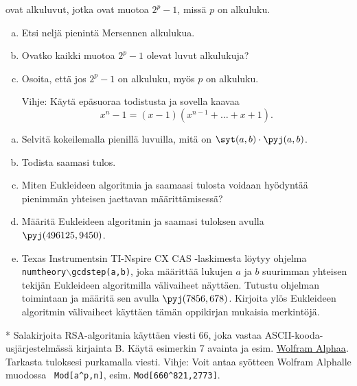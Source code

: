 \begin{kotitehtavasivu}
\begin{tehtava}
     ovat alkuluvut, jotka ovat
    muotoa $2^p - 1$, missä $p$ on alkuluku.
    \begin{enumerate}[a)]
    \item Etsi neljä pienintä Mersennen alkulukua.
    \item Ovatko kaikki muotoa $2^p - 1$ olevat luvut alkulukuja?
    \item Osoita, että jos $2^p - 1$ on alkuluku, myös $p$ on
    alkuluku.

    Vihje: Käytä epäsuoraa todistusta ja sovella kaavaa
    \[
    x^n-1 = (x-1)(x^{n-1}+\ldots+x+1).
    \]
    \end{enumerate}
\end{tehtava}

\begin{tehtava}
    \begin{enumerate}[a)]
    \item Selvitä kokeilemalla pienillä luvuilla, mitä on
    $\syt(a, b)\cdot \pyj(a, b)$.
    \item Todista saamasi tulos.
    \item Miten Eukleideen algoritmia ja saamaasi tulosta voidaan
    hyödyntää pienimmän yhteisen jaettavan määrittämisessä?
    \item Määritä Eukleideen algoritmin ja saamasi tuloksen
    avulla\\ $\pyj(496125, 9450)$.
    \item Texas Instrumentsin TI-Nspire CX CAS -laskimesta löytyy
    ohjelma \\{\tt numtheory$\backslash$gcdstep(a,b)}, joka määrittää
    lukujen $a$ ja $b$ suurimman yhteisen tekijän Eukleideen
    algoritmilla välivaiheet näyttäen. Tutustu ohjelman toimintaan ja
    määritä sen avulla $\pyj(7856, 678)$. Kirjoita ylös Eukleideen
    algoritmin välivaiheet käyttäen tämän oppikirjan mukaisia
    merkintöjä.
    \end{enumerate}
\end{tehtava}

\begin{tehtava}
    * Salakirjoita RSA-algoritmia käyttäen
    viesti $66$, joka vastaa ASCII-kooda-\\usjärjestelmässä kirjainta
    B. Käytä esimerkin 7 avainta ja esim. \href{http://
    www.wolframalpha.com}{Wolfram Alphaa}. Tarkasta tuloksesi
    purkamalla viesti.
    Vihje: Voit antaa syötteen Wolfram Alphalle muodossa {\tt
    Mod[a\^{}p,n]}, esim. {\tt Mod[660\^{}821,2773]}.
\end{tehtava}



\end{kotitehtavasivu}
